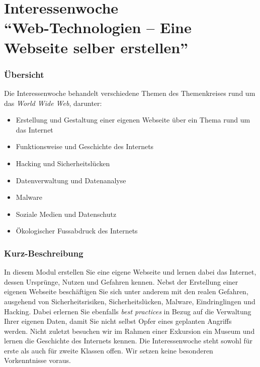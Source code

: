 %
%


\part*{Interessenwoche\\\Large \enquote{Web-Technologien -- Eine Webseite selber erstellen}}
\section{Übersicht}
Die Interessenwoche behandelt verschiedene Themen des Themenkreises rund um das \textit{World Wide Web}, darunter:
\begin{itemize}
	\item Erstellung und Gestaltung einer eigenen Webseite über ein Thema rund um das Internet
	\item Funktionsweise und Geschichte des Internets
	\item Hacking und Sicherheitslücken
	\item Datenverwaltung und Datenanalyse
	\item Malware
	\item Soziale Medien und Datenschutz
	\item Ökologischer Fussabdruck des Internets
\end{itemize}

\section{Kurz-Beschreibung}
In diesem Modul erstellen Sie eine eigene Webseite und lernen dabei das Internet, dessen Ursprünge, Nutzen und Gefahren kennen. Nebst der Erstellung einer eigenen Webseite beschäftigen Sie sich unter anderem mit den realen Gefahren, ausgehend von Sicherheitsrisiken, Sicherheitslücken, Malware, Eindringlingen und Hacking. Dabei erlernen Sie ebenfalls \textit{best practices} in Bezug auf die Verwaltung Ihrer eigenen Daten, damit Sie nicht selbst Opfer eines geplanten Angriffs werden. Nicht zuletzt besuchen wir im Rahmen einer Exkursion ein Museum und lernen die Geschichte des Internets kennen. Die Interessenwoche steht sowohl für erste als auch für zweite Klassen offen. Wir setzen keine besonderen Vorkenntnisse voraus.


